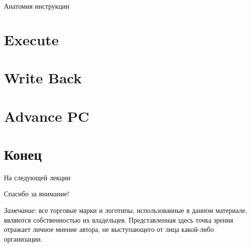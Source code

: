 \begin{frame}{Анатомия инструкции}
\centering
{}
\end{frame}

\section{Execute}

\section{Write Back}

\section{Advance PC}

\section*{Конец}

\begin{frame}{На следующей лекции}
\end{frame}

\begin{frame}

{\huge{Спасибо за внимание!}\par}

\vfill

\tiny{\textit{Замечание}: все торговые марки и логотипы, использованные в данном материале, являются собственностью их владельцев. Представленная здесь точка зрения отражает личное мнение автора, не выступающего от лица какой-либо организации.}

\end{frame}


